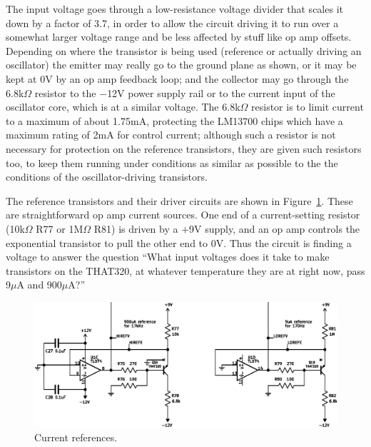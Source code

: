 The input voltage goes through a low-resistance voltage divider that scales
it down by a factor of 3.7, in order to allow the circuit driving it to run
over a somewhat larger voltage range and be less affected by stuff like op
amp offsets.  Depending on where the transistor is being used (reference or
actually driving an oscillator) the emitter may really go to the ground
plane as shown, or it may be kept at 0V by an op amp feedback loop; and the
collector may go through the 6.8k$\Omega$ resistor to the $-$12V
power supply rail or to the current input of the oscillator core, which is
at a similar voltage.  The 6.8k$\Omega$ resistor is to limit current to a
maximum of about 1.75mA, protecting the LM13700 chips which have a maximum
rating of 2mA for control current; although such a resistor is not necessary
for protection on the reference transistors, they are given such resistors
too, to keep them running under conditions as similar as possible to the
the conditions of the oscillator-driving transistors.

The reference transistors and their driver circuits are shown in
Figure~\ref{fig:current-ref}.  These are straightforward op amp current
sources.  One end of a current-setting resistor (10k$\Omega$ R77 or
1M$\Omega$ R81) is driven by a $+$9V supply, and an op amp controls the
exponential transistor to pull the other end to 0V.  Thus the circuit is
finding a voltage to answer the question ``What input voltages does it take
to make transistors on the THAT320, at whatever temperature they are at
right now, pass 9$\mu$A and 900$\mu$A?''

\begin{figure}
\centering\includegraphics{current-ref}\par
\caption{Current references.}\label{fig:current-ref}
\end{figure}

